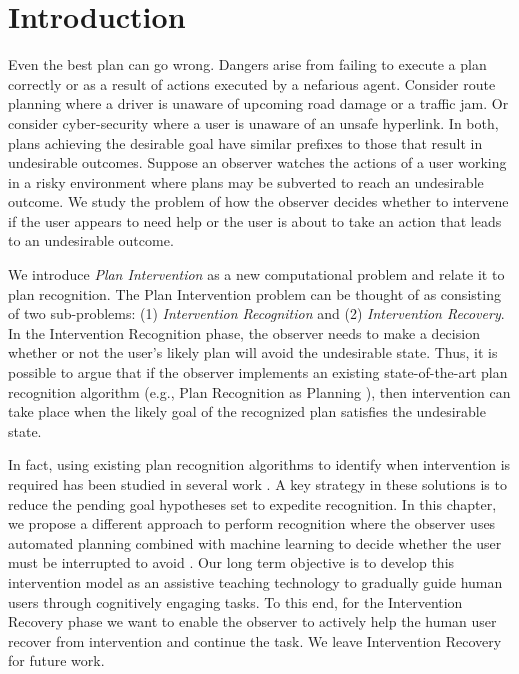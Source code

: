 \section{Introduction}
\noindent Even the best plan can go wrong. 
Dangers arise from failing to execute a plan correctly or as a result of actions executed by a nefarious agent. 
Consider route planning where a driver is unaware of upcoming road damage or a traffic jam. 
Or consider cyber-security where a user is unaware of an unsafe hyperlink. 
In both, plans achieving the desirable goal have similar prefixes to those that result in undesirable outcomes.
Suppose an observer watches the actions of a user working in a risky environment where plans may be subverted to reach an undesirable outcome. 
We study the problem of how the observer decides whether to intervene if the user appears to need help or the user is about to take an action that leads to an undesirable outcome.

We introduce \textit{Plan Intervention} as a new computational problem and relate it to plan recognition. 
The Plan Intervention problem can be thought of as consisting of two sub-problems: (1) \textit{Intervention Recognition} and (2) \textit{Intervention Recovery}.
In the Intervention Recognition phase, the observer needs to make a decision whether or not the user's likely plan will avoid the undesirable state. 
Thus, it is possible to argue that if the observer implements an existing state-of-the-art plan recognition algorithm (e.g., Plan Recognition as Planning \cite{ramirez2009plan}), then intervention can take place when the likely goal of the recognized plan satisfies the undesirable state. 

In fact, using existing plan recognition algorithms to identify when intervention is required has been studied in several work \cite{pozanco2018counterplanning, shvo2020active}.
A key strategy in these solutions is to reduce the pending goal hypotheses set to expedite recognition.
In this chapter, we propose a different approach to perform recognition where the observer uses automated planning combined with machine learning to decide whether the user must be interrupted to  avoid \undesired.
Our long term objective is to develop this intervention model as an assistive teaching technology to gradually guide human users through cognitively engaging tasks.
To this end, for the Intervention Recovery phase we want to enable the observer to  actively help the human user recover from intervention and continue the task.
We leave Intervention Recovery for future work.


